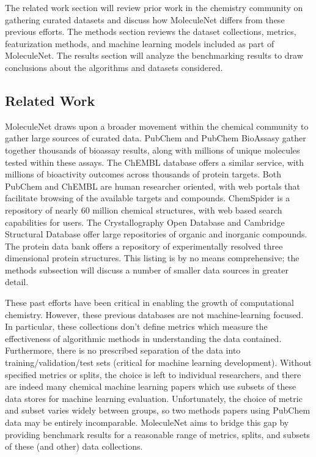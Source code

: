 The related work section will review prior work in the chemistry community on gathering curated datasets and discuss how MoleculeNet differs from these previous efforts. The methods section reviews the dataset collections, metrics, featurization methods, and machine learning models included as part of MoleculeNet. The results section will analyze the benchmarking results to draw conclusions about the algorithms and datasets considered.

\subsection{Related Work}
MoleculeNet draws upon a broader movement within the chemical community to gather large sources of curated data. PubChem \cite{bolton2008pubchem} and PubChem BioAssasy \cite{pcba_dataset} gather together thousands of bioassay results, along with millions of unique molecules tested within these assays. The ChEMBL database offers a similar service, with millions of bioactivity outcomes across thousands of protein targets. Both PubChem and ChEMBL are human researcher oriented, with web portals that facilitate browsing of the available targets and compounds. ChemSpider is a repository of nearly 60 million chemical structures, with web based search capabilities for users. The Crystallography Open Database \cite{gravzulis2009crystallography} and Cambridge Structural Database \cite{groom2016cambridge} offer large repositories of organic and inorganic compounds. The protein data bank \cite{berman2003announcing} offers a repository of experimentally resolved three dimensional protein structures. This listing is by no means comprehensive; the methods subsection will discuss a number of smaller data sources in greater detail.

These past efforts have been critical in enabling the growth of computational chemistry. However, these previous databases are not machine-learning focused. In particular, these collections don't define metrics which measure the effectiveness of algorithmic methods in understanding the data contained. Furthermore, there is no prescribed separation of the data into training/validation/test sets (critical for machine learning development). Without specified metrics or splits, the choice is left to individual researchers, and there are indeed many chemical machine learning papers which use subsets of these data stores for machine learning evaluation. Unfortunately, the choice of metric and subset varies widely between groups, so two methods papers using PubChem data may be entirely incomparable. MoleculeNet aims to bridge this gap by providing benchmark results for a reasonable range of metrics, splits, and subsets of these (and other) data collections.

